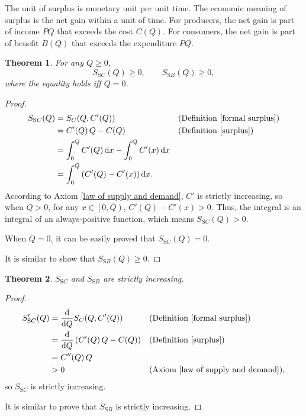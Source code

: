 \documentclass{article}
\newtheorem{theorem}{Theorem}[subsection]
\begin{document}
The unit of surplus is monetary unit per unit time.
The economic meaning of surplus is the net gain within a unit of time.
For producers, the net gain is part of income $PQ$ that exceeds the cost $C\!\left(Q\right)$.
For consumers, the net gain is part of benefit $B\!\left(Q\right)$ that exceeds the expenditure $PQ$.

\begin{theorem}
For any $Q\ge0$,
$$S_{\mathrm SC}\!\left(Q\right)\ge0,
\qquad S_{\mathrm SB}\!\left(Q\right)\ge0,$$
where the equality holds iff $Q=0$.
\end{theorem}
\begin{proof}
\begin{align*}
S_{\mathrm SC}\!\left(Q\right)&=S_C\!\left(Q,C'\!\left(Q\right)\right)&&\text{(Definition \ref{formal surplus})}\\
&=C'\!\left(Q\right)Q-C\!\left(Q\right)&&\text{(Definition \ref{surplus})}\\
&=\int_0^QC'\!\left(Q\right)\mathrm dx-\int_0^QC'\!\left(x\right)\mathrm dx\\
&=\int_0^Q\left(C'\!\left(Q\right)-C'\!\left(x\right)\right)\mathrm dx.
\end{align*}
According to Axiom \ref{law of supply and demand}, $C'$ is strictly increasing,
so when $Q>0$, for any $x\in\left[0,Q\right)$, $C'\!\left(Q\right)-C'\!\left(x\right)>0$.
Thus, the integral is an integral of an always-positive function, which means $S_{\mathrm SC}\!\left(Q\right)>0$.

When $Q=0$, it can be easily proved that $S_{\mathrm SC}\!\left(Q\right)=0$.

It is similar to show that $S_{\mathrm SB}\!\left(Q\right)\ge0$.
\end{proof}

\begin{theorem}
$S_{\mathrm SC}$ and $S_{\mathrm SB}$ are strictly increasing.
\end{theorem}
\begin{proof}
\begin{align*}
S_{\mathrm SC}'\!\left(Q\right)&=\frac{\mathrm d}{\mathrm dQ}S_C\!\left(Q,C'\!\left(Q\right)\right)&&\text{(Definition \ref{formal surplus})}\\
&=\frac{\mathrm d}{\mathrm dQ}\left(C'\!\left(Q\right)Q-C\!\left(Q\right)\right)&&\text{(Definition \ref{surplus})}\\
&=C''\!\left(Q\right)Q\\
&>0&&\text{(Axiom \ref{law of supply and demand})},
\end{align*}
so $S_{\mathrm SC}$ is strictly increasing.

It is similar to prove that $S_{\mathrm SB}$ is strictly increasing.
\end{proof}
\end{document}

